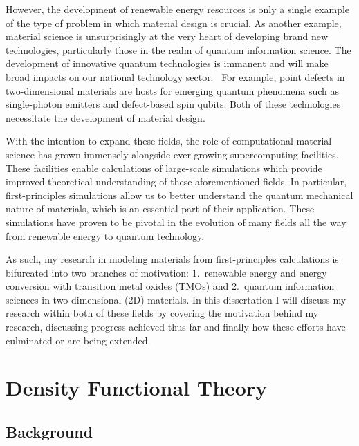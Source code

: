 However, the development of renewable energy resources is only a single example of the type of problem in which material design is crucial. As another example, material science is unsurprisingly at the very heart of developing brand new technologies, particularly those in the realm of quantum information science. The development of innovative quantum technologies is immanent and will make broad impacts on our national technology sector.~\cite{quantum} For example, point defects in two-dimensional materials are hosts for emerging quantum phenomena such as single-photon emitters and defect-based spin qubits. Both of these technologies necessitate the development of material design.

With the intention to expand these fields, the role of computational material science has grown immensely alongside ever-growing supercomputing facilities. These facilities enable calculations of large-scale simulations which provide improved theoretical understanding of these aforementioned fields. In particular, first-principles simulations allow us to better understand the quantum mechanical nature of materials, which is an essential part of their application. These simulations have proven to be pivotal in the evolution of many fields all the way from renewable energy to quantum technology.

As such, my research in modeling materials from first-principles calculations is bifurcated into two branches of motivation: 1.\ renewable energy and energy conversion with transition metal oxides (TMOs) and 2.\ quantum information sciences in two-dimensional (2D) materials. In this dissertation I will discuss my research within both of these fields by covering the motivation behind my research, discussing progress achieved thus far and finally how these efforts have culminated or are being extended.



\section{Density Functional Theory}

\subsection{Background}

